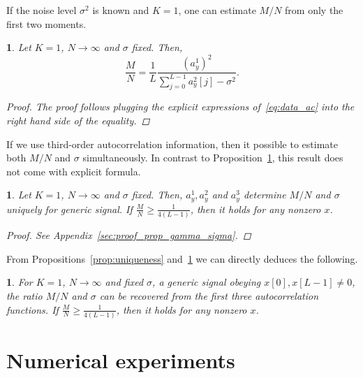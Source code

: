 \documentclass[english,11pt]{article}
\numberwithin{equation}{section}
\theoremstyle{plain}
\theoremstyle{definition}
\theoremstyle{remark}
\theoremstyle{plain}
\theoremstyle{remark}
\theoremstyle{plain}
\newtheorem{corollary}[thm]{\protect\corollaryname}
\theoremstyle{plain}
\newtheorem{proposition}[thm]{\protect\propositionname}
\providecommand{\corollaryname}{Corollary}
\providecommand{\propositionname}{Proposition}
\begin{document}


If the noise level $\sigma^2$ is known and  $K=1$, one can estimate $M/N$ from only the first two moments.
\begin{proposition} \label{prop:gamma}
	Let $K=1$, $N\to\infty$ and $\sigma$ fixed. Then, 
	\begin{equation*}
	\frac{M}{N} = \frac{1}{L}\frac{(a^1_y)^2}{\sum_{j=0}^{L-1}a_y^2[j]-\sigma^2}.
	\end{equation*}
	\begin{proof}
The proof follows plugging the explicit expressions of~\eqref{eq:data_ac} into the right hand side of the equality.
\end{proof}
\end{proposition}

If we use third-order autocorrelation information, then it possible to estimate both $M/N$ and $\sigma$ simultaneously. In contrast to Proposition~\ref{prop:gamma}, this result does not come with explicit formula.
\begin{proposition} \label{prop:gamma_sigma}
	Let $K=1$, $N\to\infty$ and $\sigma$ fixed. Then, $a_y^1,a_y^2$ and  $a_y^3$ determine $M/N$ and $\sigma$ uniquely for generic signal. If $\frac{M}{N}\geq\frac{1}{4(L-1)}$, then it holds for any nonzero $x$. 
	\begin{proof}
		See Appendix~\ref{sec:proof_prop_gamma_sigma}.
	\end{proof}
\end{proposition}

From Propositions~\ref{prop:uniqueness} and~\ref{prop:gamma_sigma} we can directly deduces the following.
\begin{corollary}
	For $K=1$, $N\to\infty$ and fixed $\sigma$, a generic signal obeying $x[0],x[L-1]\neq 0$, the ratio $M/N$ and $\sigma$ can be recovered from the first three autocorrelation functions. If  $\frac{M}{N}\geq\frac{1}{4(L-1)}$, then it holds for any nonzero $x$.
\end{corollary}


\section{Numerical experiments}   \label{sec:numerics}
\end{document}
